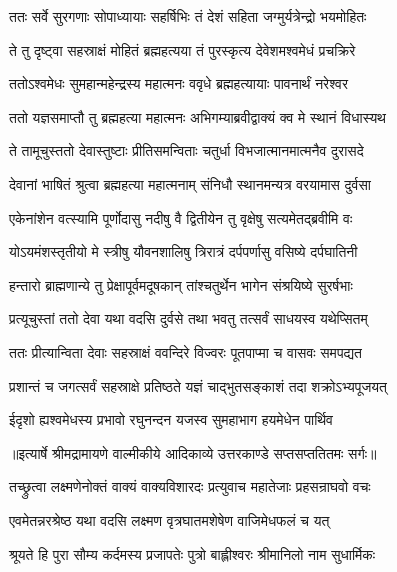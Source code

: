 \twolineshloka
{ततः सर्वे सुरगणाः सोपाध्यायाः सहर्षिभिः}
{तं देशं सहिता जग्मुर्यत्रेन्द्रो भयमोहितः} %

\twolineshloka
{ते तु दृष्ट्वा सहस्राक्षं मोहितं ब्रह्महत्यया}
{तं पुरस्कृत्य देवेशमश्वमेधं प्रचक्रिरे} %

\twolineshloka
{ततोऽश्वमेधः सुमहान्महेन्द्रस्य महात्मनः}
{ववृधे ब्रह्महत्यायाः पावनार्थं नरेश्वर} %

\twolineshloka
{ततो यज्ञसमाप्तौ तु ब्रह्महत्या महात्मनः}
{अभिगम्याब्रवीद्वाक्यं क्व मे स्थानं विधास्यथ} %

\twolineshloka
{ते तामूचुस्ततो देवास्तुष्टाः प्रीतिसमन्विताः}
{चतुर्धा विभजात्मानमात्मनैव दुरासदे} %

\twolineshloka
{देवानां भाषितं श्रुत्वा ब्रह्महत्या महात्मनाम्}
{संनिधौ स्थानमन्यत्र वरयामास दुर्वसा} %

\twolineshloka
{एकेनांशेन वत्स्यामि पूर्णोदासु नदीषु वै}
{द्वितीयेन तु वृक्षेषु सत्यमेतद्ब्रवीमि वः} %

\twolineshloka
{योऽयमंशस्तृतीयो मे स्त्रीषु यौवनशालिषु}
{त्रिरात्रं दर्पपर्णासु वसिष्ये दर्पघातिनी} %

\twolineshloka
{हन्तारो ब्राह्मणान्ये तु प्रेक्षापूर्वमदूषकान्}
{तांश्चतुर्थेन भागेन संश्रयिष्ये सुरर्षभाः} %

\twolineshloka
{प्रत्यूचुस्तां ततो देवा यथा वदसि दुर्वसे}
{तथा भवतु तत्सर्वं साधयस्व यथेप्सितम्} %

\twolineshloka
{ततः प्रीत्यान्विता देवाः सहस्राक्षं ववन्दिरे}
{विज्वरः पूतपाप्मा च वासवः समपद्यत} %

\twolineshloka
{प्रशान्तं च जगत्सर्वं सहस्राक्षे प्रतिष्ठते}
{यज्ञं चाद्भुतसङ्काशं तदा शक्रोऽभ्यपूजयत्} %

\twolineshloka
{ईदृशो ह्यश्वमेधस्य प्रभावो रघुनन्दन}
{यजस्व सुमहाभाग हयमेधेन पार्थिव} %


{॥इत्यार्षे श्रीमद्रामायणे वाल्मीकीये आदिकाव्ये उत्तरकाण्डे सप्तसप्ततितमः सर्गः॥}


\twolineshloka
{तच्छ्रुत्वा लक्ष्मणेनोक्तं वाक्यं वाक्यविशारदः}
{प्रत्युवाच महातेजाः प्रहसन्राघवो वचः} %

\twolineshloka
{एवमेतन्नरश्रेष्ठ यथा वदसि लक्ष्मण}
{वृत्रघातमशेषेण वाजिमेधफलं च यत्} %

\twolineshloka
{श्रूयते हि पुरा सौम्य कर्दमस्य प्रजापतेः}
{पुत्रो बाह्लीश्वरः श्रीमानिलो नाम सुधार्मिकः} %

